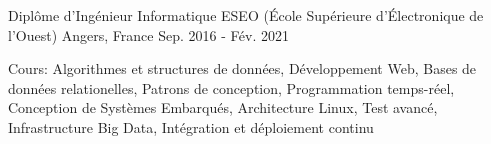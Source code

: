 

\begin{cventries}

  \cventry
    {Diplôme d'Ingénieur Informatique} %
    {ESEO (École Supérieure d'Électronique de l'Ouest)} %
    {Angers, France} %
    {Sep. 2016 - Fév. 2021} %
    {
      \begin{cvitems} %
        \item {Cours: Algorithmes et structures de données, Développement Web, Bases de données relationelles, Patrons de conception, Programmation temps-réel, Conception de Systèmes Embarqués, Architecture Linux, Test avancé, Infrastructure Big Data, Intégration et déploiement continu}
      \end{cvitems}
    }

\end{cventries}
